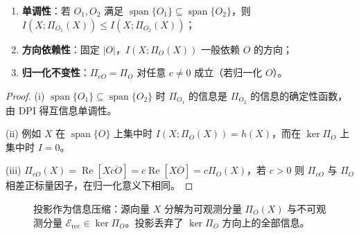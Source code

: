 \begin{property}[投影信息压缩的基本性质]\label{prop:dyn_projection_compression_properties}
\begin{enumerate}[label=(\roman*)]
    \item \textbf{单调性}：若 $O_1,O_2$ 满足 $\operatorname{span}\{O_1\}\subseteq\operatorname{span}\{O_2\}$，则 $I(X;\Pi_{O_1}(X))\le I(X;\Pi_{O_2}(X))$；
    \item \textbf{方向依赖性}：固定 $|O|$，$I(X;\Pi_O(X))$ 一般依赖 $O$ 的方向；
    \item \textbf{归一化不变性}：$\Pi_{cO}=\Pi_O$ 对任意 $c\neq 0$ 成立（若归一化 $O$）。
\end{enumerate}
\end{property}

\begin{proof}
(i) $\operatorname{span}\{O_1\}\subseteq\operatorname{span}\{O_2\}$ 时 $\Pi_{O_1}$ 的信息是 $\Pi_{O_2}$ 的信息的确定性函数，由 DPI 得互信息单调性。

(ii) 例如 $X$ 在 $\operatorname{span}\{O\}$ 上集中时 $I(X;\Pi_O(X))=h(X)$，而在 $\ker\Pi_O$ 上集中时 $I=0$。

(iii) $\Pi_{cO}(X)=\operatorname{Re}[X\overline{cO}]=c\operatorname{Re}[X\overline O]=c\Pi_O(X)$，若 $c>0$ 则 $\Pi_{cO}$ 与 $\Pi_O$ 相差正标量因子，在归一化意义下相同。
\end{proof}

\begin{figure}[htbp]
\centering
{}
\caption{投影作为信息压缩：源向量 $X$ 分解为可观测分量 $\Pi_O(X)$ 与不可观测分量 $\mathcal E_{\text{rec}}\in\ker\Pi_O$。投影丢弃了 $\ker\Pi_O$ 方向上的全部信息。}
\label{fig:projection_information_compression}
\end{figure}

